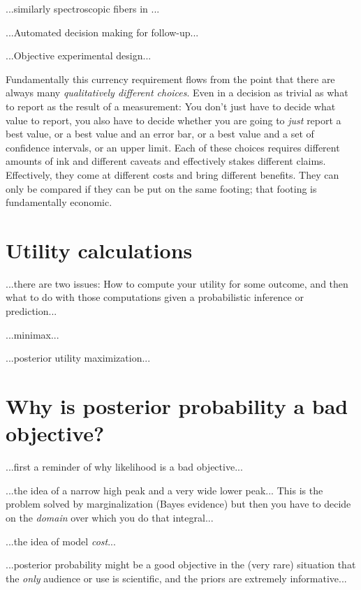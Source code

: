 \documentclass[12pt,twoside,pdftex]{article}
\begin{document}
...similarly spectroscopic fibers in ...

...Automated decision making for follow-up...

...Objective experimental design...

Fundamentally this currency requirement flows from the point that
there are always many \emph{qualitatively different choices}.  Even in
a decision as trivial as what to report as the result of a
measurement: You don't just have to decide what value to report, you
also have to decide whether you are going to \emph{just} report a best
value, or a best value and an error bar, or a best value and a set of
confidence intervals, or an upper limit.  Each of these choices
requires different amounts of ink and different caveats and
effectively stakes different claims.  Effectively, they come at
different costs and bring different benefits.  They can only be
compared if they can be put on the same footing; that footing is
fundamentally economic.

\section{Utility calculations}


...there are two issues: How to compute your utility for some outcome,
and then what to do with those computations given a probabilistic
inference or prediction...

...minimax...

...posterior utility maximization...

\section{Why is posterior probability a bad objective?}

...first a reminder of why likelihood is a bad objective...

...the idea of a narrow high peak and a very wide lower peak...  This
is the problem solved by marginalization (Bayes evidence) but then you
have to decide on the \emph{domain} over which you do that integral...

...the idea of model \emph{cost}...

...posterior probability might be a good objective in the (very rare)
situation that the \emph{only} audience or use is scientific, and the
priors are extremely informative...
\end{document}
